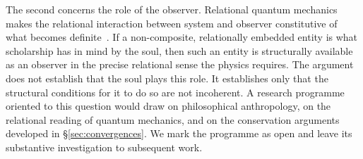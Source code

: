 The second concerns the role of the observer.
Relational quantum mechanics makes the relational interaction between system
and observer constitutive of what becomes definite~\citep{Rovelli1996}.
If a non-composite, relationally embedded entity is what \bahai scholarship
has in mind by the soul, then such an entity is structurally available as an
observer in the precise relational sense the physics requires.
The argument does not establish that the soul plays this role.
It establishes only that the structural conditions for it to do so are not
incoherent.
A research programme oriented to this question would draw on \bahai
philosophical anthropology, on the relational reading of quantum mechanics,
and on the conservation arguments developed in \S\ref{sec:convergences}.
We mark the programme as open and leave its substantive investigation to
subsequent work.

